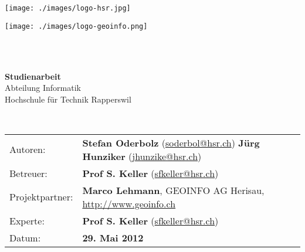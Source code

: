 \begin{titlepage}
\begin{flushleft}

\noindent\begin{minipage}[t]{0.49\textwidth}
	\begin{flushleft}
		\vspace{0pt} %
		\texttt{[image: ./images/logo-hsr.jpg]}
	\end{flushleft}
\end{minipage}
\hfill
\begin{minipage}[t]{0.49\textwidth}
	\begin{flushright}
		\vspace{0pt} %
		\texttt{[image: ./images/logo-geoinfo.png]}
	\end{flushright}
\end{minipage}
\\[1.5cm]

\\[1.5cm]

\begin{center}
{\Large \bfseries Studienarbeit}\\[0.5cm]
{\Large
	Abteilung Informatik \\[0.2cm]
	Hochschule für Technik Rapperswil
}\\[1.5cm]
\end{center}

\\[1.5cm]

\begin{tabular}{lp{12cm}}
Autoren: & \textbf{Stefan Oderbolz} (\url{soderbol@hsr.ch}) \newline
 \textbf{Jürg Hunziker} (\url{jhunzike@hsr.ch}) \\ 
Betreuer: & \textbf{Prof S. Keller} (\url{sfkeller@hsr.ch}) \\ 
Projektpartner: & \textbf{Marco Lehmann}, GEOINFO AG Herisau, \url{http://www.geoinfo.ch} \\ 
Experte: & \textbf{Prof S. Keller} (\url{sfkeller@hsr.ch}) \\ 
Datum: & \textbf{29. Mai 2012} \\ 
\end{tabular}

\end{flushleft}
\end{titlepage}
